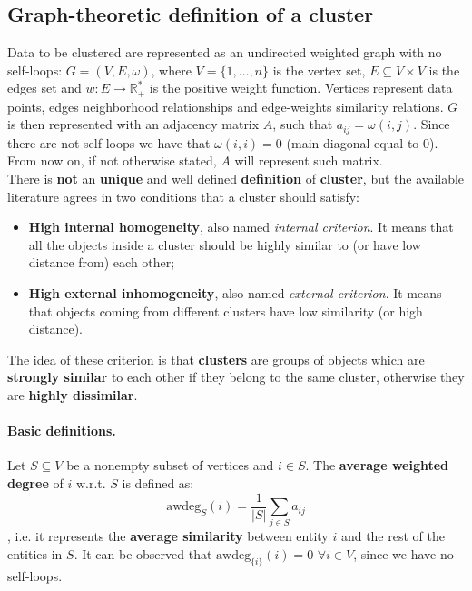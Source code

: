 \subsection{Graph-theoretic definition of a cluster}
Data to be clustered are represented as an undirected weighted graph with no self-loops: $G=(V, E, \omega)$, where $V=\{1,\dots,n\}$ is the vertex set, $E\subseteq V\times V$ is the edges set and $w: E\rightarrow \mathbb{R}^*_+$ is the positive weight function. Vertices represent data points, edges neighborhood relationships and edge-weights similarity relations. $G$ is then represented with an adjacency matrix $A$, such that $a_{ij} = \omega(i,j)$. Since there are not self-loops we have that $\omega(i,i) = 0$ (main diagonal equal to $0$). From now on, if not otherwise stated, $A$ will represent such matrix. \\
There is \textbf{not} an \textbf{unique} and well defined \textbf{definition} of \textbf{cluster}, but the available literature agrees in two conditions that a cluster should satisfy:
\begin{itemize}
  \item \textbf{High internal homogeneity}, also named \textit{internal criterion}. It means that all the objects inside a cluster should be highly similar to (or have low distance from) each other;
  \item \textbf{High external inhomogeneity}, also named \textit{external criterion}. It means that objects coming from different clusters have low similarity (or high distance).
\end{itemize}
The idea of these criterion is that \textbf{clusters} are groups of objects which are \textbf{strongly similar} to each other if they belong to the same cluster, otherwise they are \textbf{highly dissimilar}. 

\paragraph{Basic definitions.}

Let $S\subseteq V$ be a nonempty subset of vertices and $i \in S$. The \textbf{average weighted degree} of $i$ w.r.t. $S$ is defined as:
\begin{equation}
  \text{awdeg}_S(i)=\frac{1}{|S|}\sum_{j\in S}a_{ij}
\end{equation}
, i.e. it represents the \textbf{average similarity} between entity $i$ and the rest of the entities in $S$. It can be observed that $\text{awdeg}_{\{i\}}(i) = 0$  $\forall i \in V$, since we have no self-loops.\\

